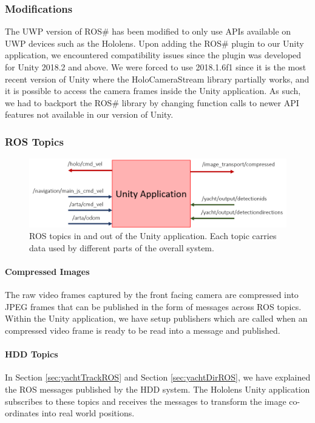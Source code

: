 \subsubsection{Modifications} The UWP version of ROS\# has been modified to only use APIs available on UWP devices such as the Hololens. Upon adding the ROS\# plugin to our Unity application, we encountered compatibility issues since the plugin was developed for Unity 2018.2 and above. We were forced to use 2018.1.6f1 since it is the most recent version of Unity where the HoloCameraStream library partially works, and it is possible to access the camera frames inside the Unity application. As such, we had to backport the ROS\# library by changing function calls to newer API features not available in our version of Unity.

\subsubsection{ROS Topics}

\begin{figure}[ht]
	\centering
	\includegraphics[width=1.0\linewidth]{img/chapter5_implementation/holoROSTopics.png}
	\caption{ROS topics in and out of the Unity application. Each topic carries data used by different parts of the overall system.}
	\label{fig:unityComms}
\end{figure}

\paragraph{Compressed Images} The raw video frames captured by the front facing camera are compressed into JPEG frames that can be published in the form of  messages across ROS topics. Within the Unity application, we have setup  publishers which are called when an compressed video frame is ready to be read into a message and published.

\paragraph{HDD Topics} In Section \ref{sec:yachtTrackROS} and Section \ref{sec:yachtDirROS}, we have explained the ROS messages published by the HDD system. The Hololens Unity application subscribes to these topics and receives the messages to transform the image co-ordinates into real world positions.

